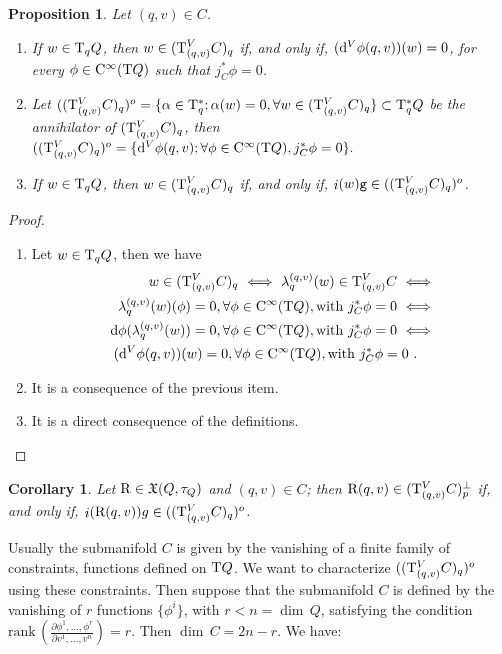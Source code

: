 \documentclass[12pt]{report}
\newtheorem{prop}[teor]{Proposition}
\newtheorem{corol}[teor]{Corollary}
\def\dst{\displaystyle}
\def\derpar#1#2{\frac{\partial{#1}}{\partial{#2}}}
\def\coor#1#2#3{{#1}^{#2}, \ldots, {#1}^{#3}}
\def\qed{\ifvmode\removelastskip\fi
{\unskip\nobreak\hfil\penalty50\hbox{}\nobreak\hfil
\hbox{\vrule height1.2ex width1.2ex}\parfillskip=0pt
\finalhyphendemerits=0 \par\smallskip}}
\def\vf{\mathfrak X}
\def\d{{\rm d}}
\def\Tan{{\rm T}}
\def\inn{\mathop{i}\nolimits}
\def\Cinfty{{\rm C}^\infty}
\begin{document}
\begin{prop}\label{verticalvectors}
Let $(q,v)\in C$.
\begin{enumerate}
\item If $w\in\Tan_qQ$, then  \(\dst w\in(\Tan_{(q,v)}^VC)_q\) if, and only if,
$(\d^V\phi(q,v))(w)=0$,
for every $\phi\in\Cinfty (\Tan Q)$ such that $j_C^*\phi =0$.
\item Let $((\Tan_{(q,v)}^VC)_q)^o=\{\alpha\in\Tan^{*}_{q}; \alpha(w)=0, \forall w\in(\Tan_{(q,v)}^VC)_q\}\subset\Tan^{*}_{q}Q$ be the annihilator of $(\Tan_{(q,v)}^VC)_q$, then $
((\Tan_{(q,v)}^VC)_q)^o=\{\d^V\phi(q,v);\forall  \phi\in\Cinfty(\Tan Q),   j_C^*\phi=0\}.
$
\item If $w\in\Tan_qQ$, then  \(\dst w\in(\Tan_{(q,v)}^VC)_q\) if, and only if, $\inn(w){\tt g}\in((\Tan_{(q,v)}^VC)_q)^o$.
\end{enumerate}
\end{prop}
\begin{proof}
\begin{enumerate}
\item Let $w\in\Tan_qQ$, then we have
\begin{eqnarray*}
w\in(\Tan_{(q,v)}^VC)_q\ \Longleftrightarrow \
\lambda_q^{(q,v)}(w)\in\Tan_{(q,v)}^VC \ \Longleftrightarrow \\
\lambda_q^{(q,v)}(w)(\phi)=0, \forall  \phi\in\Cinfty(\Tan Q),  \mathrm{with} \,\, j_C^*\phi=0
\ \Longleftrightarrow\\
\d\phi(\lambda_q^{(q,v)}(w))=0, \forall  \phi\in\Cinfty(\Tan Q), \mathrm{with} \,\, j_C^*\phi=0 
\ \Longleftrightarrow \\
(\d^V\phi(q,v))(w)=0,\forall  \phi\in\Cinfty(\Tan Q),  \mathrm{with} \,\, j_C^*\phi=0\ . \quad
\end{eqnarray*}
\item It is a consequence of the previous item.
\item It is a direct consequence of the definitions.
\end{enumerate}
\qed \end{proof}

\begin{corol}
Let ${\rm R}\in\vf (Q,\tau_Q)$ and $(q,v)\in C$; then
${\rm R}(q,v)\in(\Tan^V_{(q,v)}C)^\perp_p$ if, and only if, 
$\inn({\rm R}(q,v))g\in((\Tan_{(q,v)}^VC)_q)^o$.
\end{corol}

Usually the submanifold $C$ is given by the vanishing of a finite family of constraints, functions defined on $\Tan Q$. We want to characterize $((\Tan_{(q,v)}^VC)_q)^o$ using these constraints. Then suppose that the submanifold $C$ is defined by the vanishing of $r$ functions $\{\phi^i\}$, with $r<n=\dim\, Q$, satisfying the condition
\(\dst \mathrm{rank}\,\left(\derpar{\coor{\phi}{1}{r}}{\coor{v}{1}{n}}\right)=r\). Then $\dim\, C=2n-r$.
We have:
\end{document}
